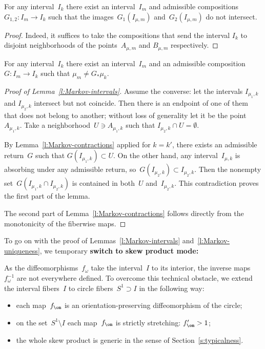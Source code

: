 \documentclass[a4paper,12pt]{amsart}
\begin{document}
\begin{Cor} \label{cor:nonintersect}
For any interval~$I_k$ there exist an interval~$I_m$ and admissible compositions $G_{1, 2} \colon I_m \to I_k$ such that the images~$G_1 (I_{\mu,m})$ and~$G_2(I_{\mu,m})$ do not intersect.
\end{Cor}

\begin{proof}
Indeed, it suffices to take the compositions that send the interval $I_k$ to disjoint neighborhoods of the points~$A_{\mu,m}$ and $B_{\mu,m}$ respectively.
\end{proof}

\begin{Cor} \label{cor:meas_not_coincide}
For any interval~$I_k$ there exist an interval~$I_m$ and an admissible composition $G \colon I_m \to I_k$ such that $\mu_m \neq G_* \mu_k$.
\end{Cor}

\begin{proof}[Proof of Lemma~\ref{l:Markov-intervals}]
Assume the converse: let the intervals $I_{\mu_1,k}$ and $I_{\mu_2,k}$ intersect but not coincide. Then there is an endpoint of one of them that does not belong to another; without loss of generality let it be the point~$A_{\mu_1,k}$. Take a neighborhood~$U \ni A_{\mu_1,k}$ such that $I_{\mu_2,k} \cap U = \emptyset$.

By Lemma~\ref{l:Markov-contractions} applied for $k=k'$, there exists an admissible return~$G$ such that $G(I_{\mu_1,k}) \subset U$. On the other hand, any interval~$I_{\mu,k}$ is absorbing under any admissible return, so~$G(I_{\mu_2,k}) \subset I_{\mu_2,k}$. Then the nonempty set~$G(I_{\mu_1,k} \cap I_{\mu_2,k})$ is contained in both~$U$ and~$I_{\mu_2,k}$. This contradiction proves the first part of the lemma.

The second part of Lemma~\ref{l:Markov-contractions} follows directly from the monotonicity of the fiberwise maps.
\end{proof}

To go on with the proof of Lemmas~\ref{l:Markov-intervals} and~\ref{l:Markov-uniqueness}, we temporary \textbf{switch to skew product mode:}

As the diffeomorphisms~$f_{\omega}$ take the interval~$I$ to its interior, the inverse maps~$f_{\omega}^{-1}$ are not everywhere defined. To overcome this technical obstacle, we extend the interval fibers~$I$ to circle fibers~$S^1 \supset I$ in the following way:
\begin{itemize}
\item each map~$f_\om$ is an orientation-preserving diffeomorphism of the circle;
\item on the set~$S^1 \setminus I$ each map~$f_\om$ is strictly stretching: $f_\om' > 1$;
\item the whole skew product is generic in the sense of Section~\ref{s:typicalness}.
\end{itemize}
\end{document}
